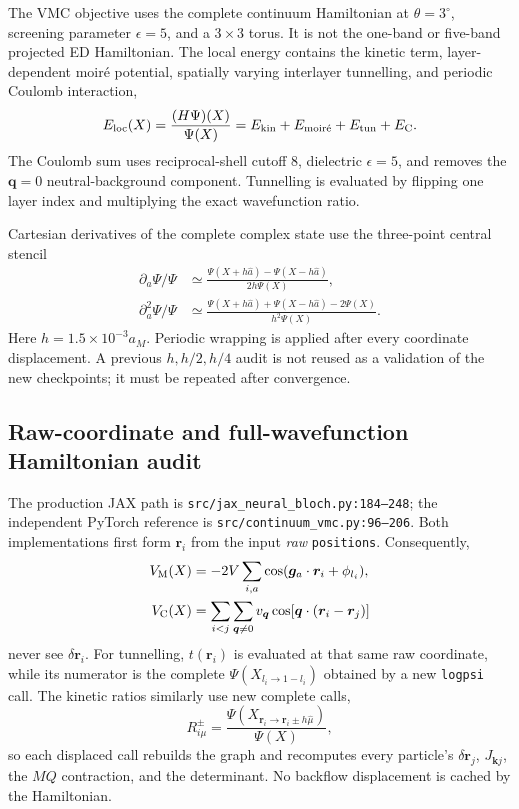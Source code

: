 The VMC objective uses the complete continuum Hamiltonian at
$\theta=3^\circ$, screening parameter $\epsilon=5$, and a $3\times3$ torus.
It is not the one-band or five-band projected ED Hamiltonian. The local energy
contains the kinetic term, layer-dependent moir\'e potential, spatially
varying interlayer tunnelling, and periodic Coulomb interaction,
\begin{equation}
 E_{\rm loc}(X)=\frac{(H\Psi)(X)}{\Psi(X)}
 =E_{\rm kin}+E_{\rm moir\acute e}+E_{\rm tun}+E_{\rm C}.
\end{equation}
The Coulomb sum uses reciprocal-shell cutoff 8, dielectric $\epsilon=5$, and
removes the $\bm q=0$ neutral-background component. Tunnelling is evaluated
by flipping one layer index and multiplying the exact wavefunction ratio.

Cartesian derivatives of the complete complex state use the three-point
central stencil
\begin{align}
 \partial_a\Psi/\Psi&\simeq
 \frac{\Psi(X+h\hat a)-\Psi(X-h\hat a)}{2h\Psi(X)},\\
 \partial_a^2\Psi/\Psi&\simeq
 \frac{\Psi(X+h\hat a)+\Psi(X-h\hat a)-2\Psi(X)}
 {h^2\Psi(X)} .
\end{align}
Here $h=1.5\times10^{-3}a_M$. Periodic wrapping is applied after every
coordinate displacement. A previous $h,h/2,h/4$ audit is not reused as a
validation of the new checkpoints; it must be repeated after convergence.

\subsection{Raw-coordinate and full-wavefunction Hamiltonian audit}

The production JAX path is \texttt{src/jax\_neural\_bloch.py:184--248}; the
independent PyTorch reference is
\texttt{src/continuum\_vmc.py:96--206}.  Both implementations first form
$\bm r_i$ from the input \emph{raw} \texttt{positions}.  Consequently,
\begin{align}
 V_{\rm M}(X)&=-2V\sum_{i,a}\cos(\bm g_a\cdot\bm r_i+\phi_{l_i}),\\
 V_{\rm C}(X)&=\sum_{i<j}\sum_{\bm q\ne0}v_{\bm q}
 \cos[\bm q\cdot(\bm r_i-\bm r_j)]
\end{align}
never see $\delta\bm r_i$.  For tunnelling, $t(\bm r_i)$ is evaluated at
that same raw coordinate, while its numerator is the complete
$\Psi(X_{l_i\to1-l_i})$ obtained by a new \texttt{logpsi} call.  The kinetic
ratios similarly use new complete calls,
\begin{equation}
 R_{i\mu}^{\pm}=\frac{\Psi(X_{\bm r_i\to\bm r_i\pm h\hat\mu})}
 {\Psi(X)},
\end{equation}
so each displaced call rebuilds the graph and recomputes every particle's
$\delta\bm r_j$, $J_{\bm k j}$, the $M Q$ contraction, and the determinant.
No backflow displacement is cached by the Hamiltonian.


